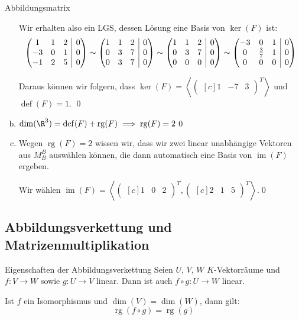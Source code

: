 \documentclass[german]{../spicker}
\makeatletter
\newcommand{\scalarprod}[1]{\left\langle #1 \right\rangle}
\newcommand{\vektor}[1]{\begin{pmatrix*}[c] #1 \end{pmatrix*}}
\newcommand{\im}{\operatorname{im}}
\newcommand{\rg}{\operatorname{rg}}
\newcommand{\defect}{\operatorname{def}}
\newenvironment{sysmatrix}[1]
 {\left(\begin{array}{@{}#1@{}}}
 {\end{array}\right)}
\makeatother
\begin{document}
\begin{example}{Abbildungsmatrix}
\begin{enumerate}[a)]
              Wir erhalten also ein LGS, dessen Lösung eine Basis von $\ker(F)$ ist:
              $$
                  \begin{sysmatrix}{c c c | c}
                      1 & 1 & 2 & 0 \\ -3 & 0 & 1 & 0 \\ -1 & 2 & 5 & 0
                  \end{sysmatrix}
                  \sim
                  \begin{sysmatrix}{c c c | c}
                      1 & 1 & 2 & 0 \\ 0 & 3 & 7 & 0 \\ 0 & 3 & 7 & 0
                  \end{sysmatrix}
                  \sim
                  \begin{sysmatrix}{c c c | c}
                      1 & 1 & 2 & 0 \\ 0 & 3 & 7 & 0 \\ 0 & 0 & 0 & 0
                  \end{sysmatrix}
                  \sim
                  \begin{sysmatrix}{c c c | c}
                      -3 & 0 & 1 & 0 \\ 0 & \frac{3}{7} & 1 & 0 \\ 0 & 0 & 0 & 0
                  \end{sysmatrix}
              $$

              Daraus können wir folgern, dass $\ker(F) = \scalarprod{\vektor{1 & -7 & 3}^T}$ und $\defect(F) = 1$. \qed
        \item $\dim(\R^3) = \defect(F) + \rg(F) \implies \rg(F) = 2$\qed
        \item Wegen $\rg(F) = 2$ wissen wir, dass wir zwei linear unabhängige Vektoren aus $M^B_B$ auswählen können, die dann automatisch eine Basis von $\im(F)$ ergeben.

              Wir wählen $\im(F) = \scalarprod{ \vektor{1 & 0 & 2}^T, \vektor{2 & 1 & 5}^T }$.\qed
    \end{enumerate}
\end{example}

\subsection{Abbildungsverkettung und Matrizenmultiplikation}

\begin{defi}{Eigenschaften der Abbildungsverkettung}
    Seien $U$, $V$, $W$ $K$-Vektorräume und $f : V \to W$ sowie $g : U \to V$ linear.
    Dann ist auch $f \circ g : U \to W$ linear.

    Ist $f$ ein Isomorphismus und $\dim(V) = \dim(W)$, dann gilt:
    $$
        \rg(f\circ g) = \rg(g)
    $$
\end{defi}
\end{document}
